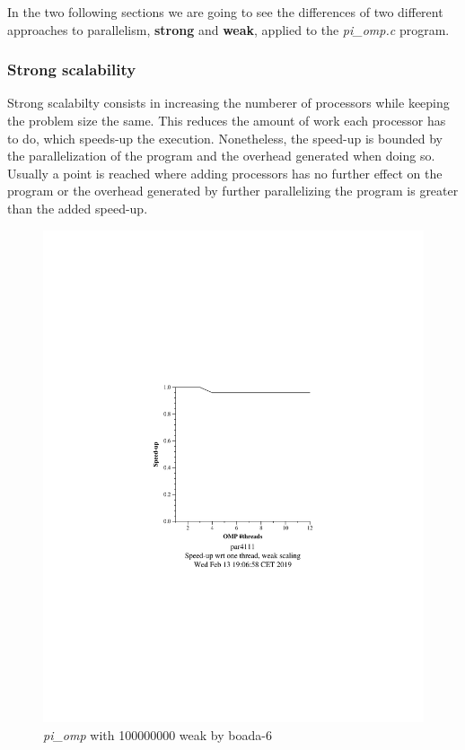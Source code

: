 \documentclass[12]{article}
\begin{document}
In the two following sections we are going to see the differences of two different approaches to parallelism, \textbf{strong} and \textbf{weak}, applied to the \textit{pi\_omp.c} program.

\subsubsection{Strong scalability}

Strong scalabilty consists in increasing the numberer of processors while keeping the problem size the same. This reduces the amount of work each processor has to do, which speeds-up the execution.
Nonetheless, the speed-up is bounded by the parallelization of the program and the overhead generated when doing so. Usually a point is reached where adding processors has no further effect on the program or the overhead generated by further parallelizing the program is greater than the added speed-up. 


\begin{figure}[H]
\centering
\includegraphics[scale=0.5]{images/pi_omp-100000000-1-12-3-weak-boada-6.png}
 \caption{ \textit{pi\_omp} with 100000000 weak by boada-6}
  \label{fig:pi_ompboada6}
\end{figure}
\end{document}
